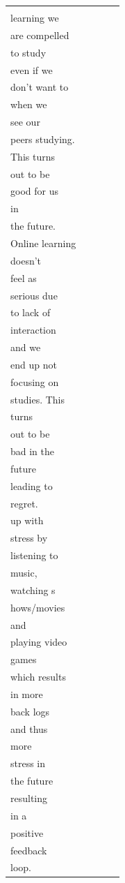 \documentclass[11pt]{scrartcl}
\begin{document}
\begin{longtable}[c]{|l|l|l|l|l|}
		\begin{tabular}[c]{@{}l@{}}In offline \\ learning we \\ are compelled \\ to study \\ even if we \\ don't want to \\ when we \\ see our \\ peers studying. \\ This turns \\ out   to be \\ good for us \\ in \\ the future. \\ Online learning \\ doesn't \\ feel as \\ serious due   \\ to lack of \\ interaction\\  and we \\ end up not \\ focusing on \\ studies. This \\ turns \\ out   to be \\ bad in the \\ future \\ leading to\\  regret.\end{tabular} &
		\begin{tabular}[c]{@{}l@{}}I coped \\ up with \\ stress by \\ listening to   \\ music, \\ watching s\\ hows/movies \\ and \\ playing video \\ games \\ which results \\ in more   \\ back logs \\ and thus \\ more \\ stress in \\ the future\\ resulting \\ in a \\ positive \\ feedback \\ loop.\end{tabular} &

\end{longtable}
\end{document}
